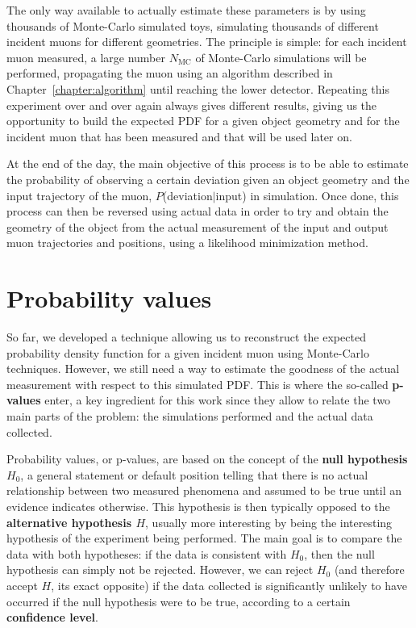 \documentclass[a4paper, 11pt]{report}
\begin{document}
The only way available to actually estimate these parameters is by using thousands of Monte-Carlo simulated toys, simulating thousands of different incident muons for different geometries. The principle is simple: for each incident muon measured, a large number $N_{\text{MC}}$ of Monte-Carlo simulations will be performed, propagating the muon using an algorithm described in Chapter~\ref{chapter:algorithm} until reaching the lower detector. Repeating this experiment over and over again always gives different results, giving us the opportunity to build the expected PDF for a given object geometry and for the incident muon that has been measured and that will be used later on.

At the end of the day, the main objective of this process is to be able to estimate the probability of observing a certain deviation given an object geometry and the input trajectory of the muon, $P$(deviation$|$input) in simulation. Once done, this process can then be reversed using actual data in order to try and obtain the geometry of the object from the actual measurement of the input and output muon trajectories and positions, using a likelihood minimization method.

\section{Probability values} \label{sec:pValues}

So far, we developed a technique allowing us to reconstruct the expected probability density function for a given incident muon using Monte-Carlo techniques. However, we still need a way to estimate the goodness of the actual measurement with respect to this simulated PDF. This is where the so-called \textbf{p-values} enter, a key ingredient for this work since they allow to relate the two main parts of the problem: the simulations performed and the actual data collected.

Probability values, or p-values, are based on the concept of the \textbf{null hypothesis $H_0$}, a general statement or default position telling that there is no actual relationship between two measured phenomena and assumed to be true until an evidence indicates otherwise. This hypothesis is then typically opposed to the \textbf{alternative hypothesis $H$}, usually more interesting by being the interesting hypothesis of the experiment being performed. The main goal is to compare the data with both hypotheses: if the data is consistent with $H_0$, then the null hypothesis can simply not be rejected. However, we can reject $H_0$ (and therefore accept $H$, its exact opposite) if the data collected is significantly unlikely to have occurred if the null hypothesis were to be true, according to a certain \textbf{confidence level}.
\end{document}
